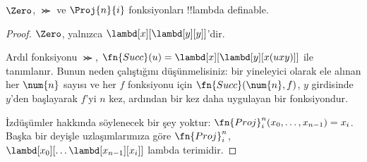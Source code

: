 


\begin{lem}
$\Zero$, $\Succ$ ve $\Proj{n}{i}$ fonksiyonları !!{lambda definable}.
\end{lem}

\begin{proof}
$\Zero$, yalnızca $\lambd[x][\lambd[y][y]]$'dir.

Ardıl fonksiyonu $\Succ$, $\fn{Succ}(u)=\lambd[x][\lambd[y][x(uxy)]]$
ile tanımlanır. Bunun neden çalıştığını düşünmelisiniz: bir yineleyici olarak
ele alınan her $\num{n}$ sayısı ve her $f$ fonksiyonu için
$\fn{Succ}(\num{n},f)$, $y$ girdisinde $y$'den başlayarak $f$'yi $n$ kez,
ardından bir kez daha uygulayan bir fonksiyondur.

İzdüşümler hakkında söylenecek bir şey yoktur:
$\fn{Proj}^n_i(x_0,\dots,x_{n-1})=x_i$. Başka bir deyişle uzlaşımlarımıza
göre $\fn{Proj}^n_i$, $\lambd[x_0][\dots\lambd[x_{n-1}][x_i]]$ lambda
terimidir.
\end{proof}

